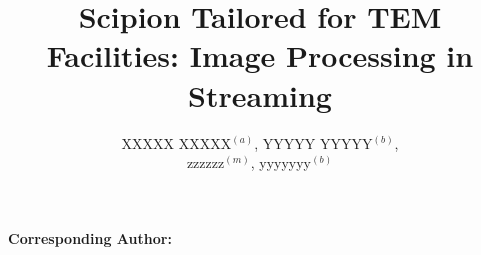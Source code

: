 \documentclass[12pt]{article}
\newcommand{\lyxaddress}[1]{
   \par {\raggedright #1
   \vspace{1.4em}
   \noindent\par}
}
\begin{document}
\title{Scipion Tailored for TEM Facilities: Image Processing in Streaming}
\author{XXXXX XXXXX$^{(a)}$, 
        YYYYY YYYYY$^{(b)}$, \\
        zzzzzz$^{(m)}$,
        yyyyyyy$^{(b)}$
        }

\maketitle


\setcounter{figure}{2}%
\textbf{Corresponding Author:} %

\newpage







\appendix




\clearpage
%

\newpage
%
%
\end{document}
